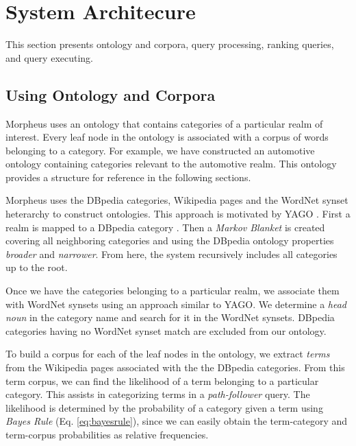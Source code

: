 \section{System Architecure}
\label{sec:systemarch}

This section presents ontology and corpora, query processing, ranking queries, and query executing.

\subsection{Using Ontology and Corpora} 
\label{sec:ontology_corpora}

Morpheus uses an ontology that contains categories of a particular realm of interest. Every leaf node in the ontology is associated with a corpus of words belonging to a category.  For example, we have constructed an automotive ontology containing categories relevant to the automotive realm. This ontology provides a structure for reference in the following sections.


Morpheus uses the DBpedia categories, Wikipedia pages and the WordNet synset heterarchy to construct ontologies. This approach is motivated by YAGO \cite{Suchanek2009phd}. First a realm is mapped to a DBpedia category \cite{Bizer2009}. 
Then a \emph{Markov Blanket} \cite{PRIS} is created covering all neighboring categories and using the DBpedia ontology properties \emph{broader} and \emph{narrower}. From here, the system recursively includes all categories up to the root.  


Once we have the categories belonging to a particular realm, we associate them with WordNet synsets using an approach similar to YAGO\cite{Suchanek2009phd}. We determine a \emph{head noun} in the category name and search for it in the WordNet synsets. DBpedia categories having no WordNet synset match are excluded from our ontology. 

To build a corpus for each of the leaf nodes in the ontology, 
we extract \emph{terms} from the Wikipedia pages associated with the 
the DBpedia categories. From this term corpus, 
we can find the likelihood of a term belonging to a particular category. This assists in categorizing terms in a \emph{path-follower} query.
The likelihood is determined by the probability of a category given a term 
using \textit{Bayes Rule} (Eq. \ref{eq:bayesrule}), since we can 
easily obtain the term-category and term-corpus probabilities as 
relative frequencies. 

